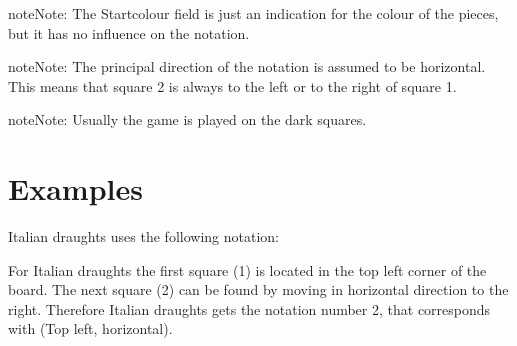 \documentclass[letterpaper,10pt,english]{sphinxmanual}
\begin{document}
\begin{sphinxadmonition}{note}{Note:}
\sphinxAtStartPar
The Start\sphinxhyphen{}colour field is just an indication for the colour of the
pieces, but it has no influence on the notation.
\end{sphinxadmonition}

\begin{sphinxadmonition}{note}{Note:}
\sphinxAtStartPar
The principal direction of the notation is assumed to be horizontal.
This means that square 2 is always to the left or to the right of square 1.
\end{sphinxadmonition}

\begin{sphinxadmonition}{note}{Note:}
\sphinxAtStartPar
Usually the game is played on the dark squares.
\end{sphinxadmonition}


\section{Examples}
\label{\detokenize{gametype:examples}}
\begin{sphinxVerbatim}[commandchars=\\\{\}]
\PYG{p}{[} \PYG{p}{]}                    
\PYG{p}{[} \PYG{p}{]}              
\PYG{p}{[} \PYG{p}{]}                   
\PYG{p}{[} \PYG{p}{]}           
\end{sphinxVerbatim}

\sphinxAtStartPar
Italian draughts uses the following notation:
\begin{quote}

\noindent{}
\end{quote}

\sphinxAtStartPar
For Italian draughts the first square (1) is located in the top left corner of
the board. The next square (2) can be found by moving in horizontal direction
to the right. Therefore Italian draughts gets the notation number 2, that
corresponds with (Top left, horizontal).
\end{document}
